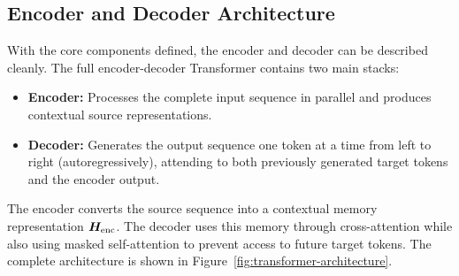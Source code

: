 \subsection{Encoder and Decoder Architecture}

With the core components defined, the encoder and decoder can be described cleanly. The full encoder-decoder Transformer contains two main stacks:
\begin{itemize}
    \item \textbf{Encoder:} Processes the complete input sequence in parallel and produces contextual source representations.
    \item \textbf{Decoder:} Generates the output sequence one token at a time from left to right (autoregressively), attending to both previously generated target tokens and the encoder output.
\end{itemize}

The encoder converts the source sequence into a contextual memory representation $\bm{H}_{\text{enc}}$. The decoder uses this memory through cross-attention while also using masked self-attention to prevent access to future target tokens. The complete architecture is shown in Figure~\ref{fig:transformer-architecture}.

